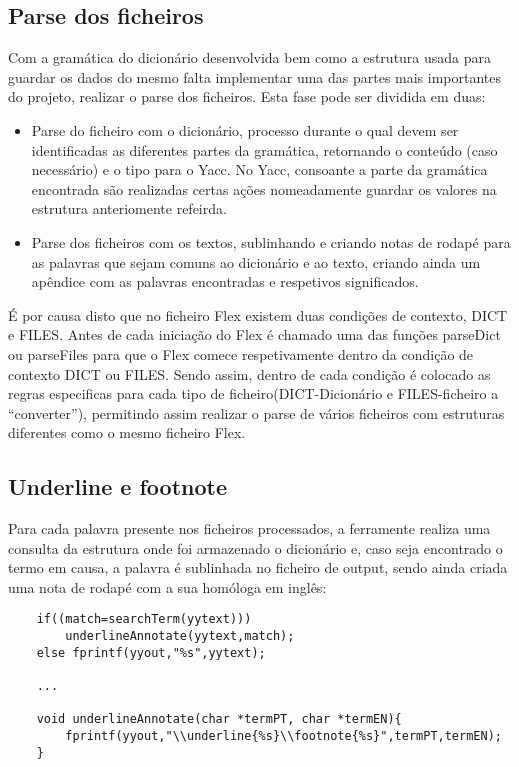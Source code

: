 \documentclass{llncs}
\begin{document}
\subsection{Parse dos ficheiros}
Com a gramática do dicionário desenvolvida bem como a estrutura usada para guardar os dados do mesmo falta implementar uma das partes mais importantes do projeto, realizar o parse dos ficheiros. Esta fase pode ser dividida em duas:
\begin{itemize}
\item Parse do ficheiro com o dicionário, processo durante o qual devem ser identificadas as diferentes partes da gramática, retornando o conteúdo (caso necessário) e o tipo para o Yacc. No Yacc, consoante a parte da gramática encontrada são realizadas certas ações nomeadamente guardar os valores na estrutura anteriomente refeirda.
\item Parse dos ficheiros com os textos, sublinhando e criando notas de rodapé para as palavras que sejam comuns ao dicionário e ao texto, criando ainda um apêndice com as palavras encontradas e respetivos significados.
\end{itemize}

É por causa disto que no ficheiro Flex existem duas condições de contexto, DICT e FILES. Antes de cada iniciação do Flex é chamado uma das funções parseDict ou parseFiles para que o Flex comece respetivamente dentro da condição de contexto DICT ou FILES. Sendo assim, dentro de cada condição é colocado as regras especificas para cada tipo de ficheiro(DICT-Dicionário e FILES-ficheiro a ``converter''), permitindo assim realizar o parse de vários ficheiros com estruturas diferentes como o mesmo ficheiro Flex.

\subsection{Underline e footnote}
Para cada palavra presente nos ficheiros processados, a ferramente realiza uma consulta da estrutura onde foi armazenado o dicionário e, caso seja encontrado o termo em causa, a palavra é sublinhada no ficheiro de output, sendo ainda criada uma nota de rodapé com a sua homóloga em inglês: 
\begin{verbatim}
    if((match=searchTerm(yytext)))
        underlineAnnotate(yytext,match);          
    else fprintf(yyout,"%s",yytext);

    ...

    void underlineAnnotate(char *termPT, char *termEN){
        fprintf(yyout,"\\underline{%s}\\footnote{%s}",termPT,termEN);
    }
\end{verbatim}
\end{document}
